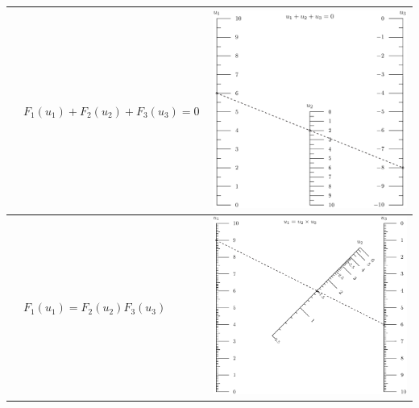 \documentclass[a4paper,11pt,english]{sphinxmanual}
\begin{document}
\begin{tabulary}{\linewidth}{|L|L|L|}
\hline

{\hyperref[types/types:type1-ref]{\emph{}}}
 & 
\(F_1(u_1)+F_2(u_2)+F_3(u_3)=0 \,\)
 & 
\includegraphics{ex_type1_nomo_1.pdf}
\\
\hline
{\hyperref[types/types:type2-ref]{\emph{}}}
 & 
\(F_1(u_1)=F_2(u_2) F_3(u_3) \,\)
 & 
\includegraphics{ex_type2_nomo_1.pdf}

\end{tabulary}
\end{document}
